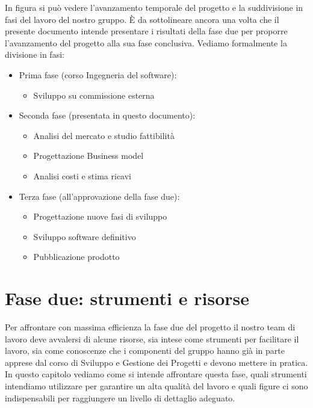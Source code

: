 \vspace*{0.5cm}

In figura  si può vedere l'avanzamento temporale del progetto e la suddivisione in fasi del lavoro del nostro gruppo. È da sottolineare ancora una volta che il presente documento intende presentare i risultati della fase due per proporre l'avanzamento del progetto alla sua fase conclusiva. Vediamo formalmente la divisione in fasi: \\

\begin{itemize}
\item Prima fase (corso Ingegneria del software):
\begin{itemize}
\item Sviluppo su commissione esterna 
\end{itemize}
\end{itemize}

\begin{itemize}
\item Seconda fase (presentata in questo documento):
\begin{itemize}
\item Analisi del mercato e studio fattibilità
\item Progettazione Business model
\item Analisi costi e stima ricavi
\end{itemize}
\end{itemize}

\begin{itemize}
\item Terza fase (all'approvazione della fase due):
\begin{itemize}
\item Progettazione nuove fasi di sviluppo
\item Sviluppo software definitivo
\item Pubblicazione prodotto
\end{itemize}
\end{itemize}

\newpage

\section{Fase due: strumenti e risorse}
Per affrontare con massima efficienza la fase due del progetto il nostro team di lavoro deve avvalersi di alcune risorse, sia intese come strumenti per facilitare il lavoro, sia come conoscenze che i componenti del gruppo hanno già in parte apprese dal corso di Sviluppo e Gestione dei Progetti e devono mettere in pratica. In questo capitolo vediamo come si intende affrontare questa fase, quali strumenti intendiamo utilizzare per garantire un alta qualità del lavoro e quali figure ci sono indispensabili per raggiungere un livello di dettaglio adeguato.

